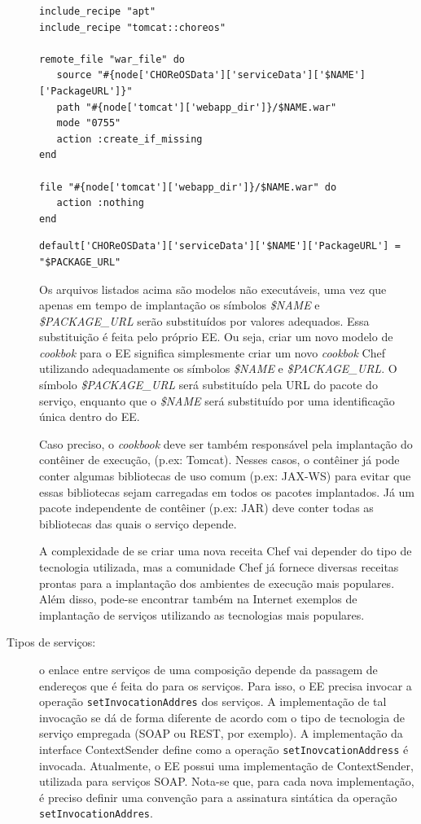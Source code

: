\begin{description}
\begin{lstlisting}[frame=trbl, label=lst:recipe_template, caption=Receita modelo para a implantação de WARs.]
include_recipe "apt" 
include_recipe "tomcat::choreos"

remote_file "war_file" do
   source "#{node['CHOReOSData']['serviceData']['$NAME']['PackageURL']}"
   path "#{node['tomcat']['webapp_dir']}/$NAME.war"
   mode "0755"
   action :create_if_missing
end

file "#{node['tomcat']['webapp_dir']}/$NAME.war" do
   action :nothing
end
\end{lstlisting}

\begin{lstlisting}[frame=trbl, label=lst:attributes_template, caption=Arquivo modelo de atributos para a implantação de WARs.]
default['CHOReOSData']['serviceData']['$NAME']['PackageURL'] = "$PACKAGE_URL"
\end{lstlisting}

Os arquivos listados acima são modelos não executáveis, uma vez que apenas em tempo de implantação 
os símbolos \emph{\$NAME} e \emph{\$PACKAGE\_URL} serão substituídos por valores adequados.
Essa substituição é feita pelo próprio EE.
Ou seja, criar um novo modelo de \emph{cookbok} para o EE significa simplesmente criar um novo \emph{cookbok} Chef
utilizando adequadamente os símbolos \emph{\$NAME} e \emph{\$PACKAGE\_URL}.
O símbolo \emph{\$PACKAGE\_URL} será substituído pela URL do pacote do serviço,
enquanto que o \emph{\$NAME} será substituído por uma identificação única dentro do EE.

Caso preciso, o \emph{cookbook} deve ser também responsável pela implantação do contêiner de execução, 
(p.ex: Tomcat). Nesses casos, o contêiner já pode conter algumas bibliotecas de uso comum (p.ex: JAX-WS)
para evitar que essas bibliotecas sejam carregadas em todos os pacotes implantados.
Já um pacote independente de contêiner (p.ex: JAR) deve conter todas as bibliotecas das quais o serviço depende. 

A complexidade de se criar uma nova receita Chef vai depender do tipo de tecnologia utilizada,
mas a comunidade Chef já fornece diversas receitas prontas para a implantação dos ambientes
de execução mais populares. Além disso, pode-se encontrar também na Internet
exemplos de implantação de serviços utilizando as tecnologias mais populares.

\item [Tipos de serviços:] o enlace entre serviços de uma composição depende da passagem de endereços que é feita do \ee para os 
serviços. Para isso, o EE precisa invocar a operação \texttt{setInvocationAddres} dos serviços. A implementação de tal invocação se dá 
de forma diferente de acordo com o tipo de tecnologia de serviço empregada (SOAP ou REST, por exemplo). 
A implementação da interface \textsf{ContextSender} define como a operação \texttt{setInovcationAddress} é invocada. 
Atualmente, o EE possui uma implementação de \textsf{ContextSender}, utilizada para serviços SOAP.
Nota-se que, para cada nova implementação, é preciso definir uma convenção para a assinatura sintática da operação \texttt
{setInvocationAddres}.


\end{description}
